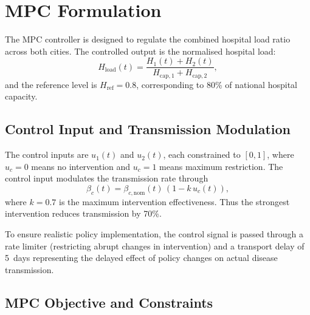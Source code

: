 \section{MPC Formulation}
\label{sec:mpc_form}

The MPC controller is designed to regulate the combined hospital load ratio across both cities.
The controlled output is the normalised hospital load:
\begin{equation}
  H_{{\mathrm{load}}}(t) = \frac{H_1(t) + H_2(t)}{H_{{\mathrm{cap}},1} + H_{{\mathrm{cap}},2}},
\end{equation}
and the reference level is $H_{\mathrm{ref}} = 0.8$, corresponding to 80\% of national hospital capacity.

\subsection{Control Input and Transmission Modulation}
\label{sec:control_input}

The control inputs are $u_1(t)$ and $u_2(t)$, each constrained to $[0, 1]$, where $u_c = 0$ means no intervention and $u_c = 1$ means maximum restriction.
The control input modulates the transmission rate through
\begin{equation}
  \beta_c(t) = \beta_{c,\mathrm{nom}}(t)\,(1 - k\,u_c(t)),
  \label{eq:beta_control}
\end{equation}
where $k = 0.7$ is the maximum intervention effectiveness.
Thus the strongest intervention reduces transmission by 70\%.

To ensure realistic policy implementation, the control signal is passed through a rate limiter (restricting abrupt changes in intervention) and a transport delay of 5~days representing the delayed effect of policy changes on actual disease transmission.

\subsection{MPC Objective and Constraints}
\label{sec:mpc_objective}

